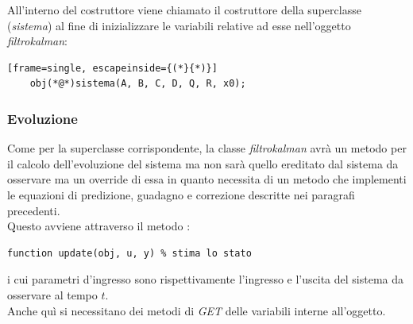 All'interno del costruttore viene chiamato il costruttore della superclasse (\textit{sistema}) al fine di inizializzare le variabili relative ad esse nell'oggetto \textit{filtrokalman}:
\begin{lstlisting}[frame=single, escapeinside={(*}{*)}]
	obj(*@*)sistema(A, B, C, D, Q, R, x0);
\end{lstlisting}


\subsubsection{Evoluzione}
Come per la superclasse corrispondente, la classe \textit{filtrokalman} avrà un metodo per il calcolo dell'evoluzione del sistema ma non sarà quello ereditato dal sistema da osservare ma un override di essa in quanto necessita di un metodo che implementi le equazioni di predizione, guadagno e correzione descritte nei paragrafi precedenti.\\
Questo avviene attraverso il metodo :
\begin{lstlisting}[frame=single]
function update(obj, u, y) % stima lo stato
\end{lstlisting}
i cui parametri d'ingresso sono rispettivamente l'ingresso e l'uscita del sistema da osservare al tempo $t$.\\
Anche quì si necessitano dei metodi di \textit{GET} delle variabili interne all'oggetto.
\newpage

